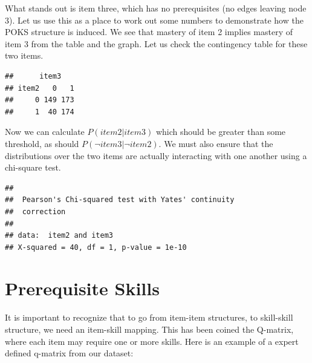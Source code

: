\documentclass[11pt]{article}\usepackage[]{graphicx}\usepackage[]{color}
\makeatletter
\newenvironment{kframe}{%
 \def\at@end@of@kframe{}%
 \ifinner\ifhmode%
  \def\at@end@of@kframe{\end{minipage}}%
  \begin{minipage}{\columnwidth}%
 \fi\fi%
 \def\FrameCommand##1{\hskip\@totalleftmargin \hskip-\fboxsep
 \colorbox{shadecolor}{##1}\hskip-\fboxsep
     \hskip-\linewidth \hskip-\@totalleftmargin \hskip\columnwidth}%
 \MakeFramed {\advance\hsize-\width
   \@totalleftmargin\z@ \linewidth\hsize
   \@setminipage}}%
 {\par\unskip\endMakeFramed%
 \at@end@of@kframe}
\newenvironment{knitrout}{}{} %
\makeatother
\begin{document}
What stands out is item three, which has no prerequisites (no edges leaving node 3). Let us use this as a place to work out some numbers to demonstrate how the POKS structure is induced. We see that mastery of item 2 implies mastery of item 3 from the table and the graph. Let us check the contingency table for these two items.\\

\begin{knitrout}
\color{fgcolor}\begin{kframe}
\begin{verbatim}
##      item3
## item2   0   1
##     0 149 173
##     1  40 174
\end{verbatim}
\end{kframe}
\end{knitrout}
Now we can calculate $P(item2|item3)$ which should be greater than some threshold, as should $P(\neg item3|\neg item2)$.
We must also ensure that the distributions over the two items are actually interacting with one another using a chi-square test.\\
\begin{knitrout}
\color{fgcolor}\begin{kframe}
\begin{verbatim}
## 
## 	Pearson's Chi-squared test with Yates' continuity
## 	correction
## 
## data:  item2 and item3
## X-squared = 40, df = 1, p-value = 1e-10
\end{verbatim}
\end{kframe}
\end{knitrout}

\section{Prerequisite Skills}
It is important to recognize that to go from item-item structures, to skill-skill structure, we need an item-skill mapping. This has been coined the Q-matrix, where each item may require one or more skills. Here is an example of a expert defined q-matrix from our dataset:\\
\end{document}
